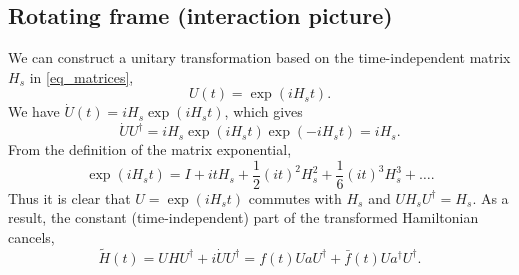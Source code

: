 \documentclass[11pt]{article}
\begin{document}

\subsection{Rotating frame (interaction picture)}

We can construct a unitary transformation based
on the time-independent matrix $H_s$ in \eqref{eq_matrices},
\[
U(t) = \exp(i H_s t).
\]
We have $\dot{U}(t) = i H_s \exp(i H_s t)$, which gives
\[
\dot{U}U^\dag =  i H_s \exp(i H_s t) \exp(- i H_s t) = i H_s.
\]
From the definition of the matrix exponential,
\[
\exp(i H_s t) = I + it H_s + \frac{1}{2} (it)^2 H_s^2 + \frac{1}{6} (it)^3 H_s^3 + \ldots.
\]
Thus it is clear that $U=\exp(i H_s t)$ commutes with $H_s$ and $UH_sU^\dag = H_s$. As a result, the
constant (time-independent) part of the transformed Hamiltonian cancels,
\[
\tilde{H}(t) = U H U^\dag + i \dot{U}U^\dag = f(t) UaU^\dag + \bar{f}(t) Ua^\dag U^\dag.
\]
\end{document}

